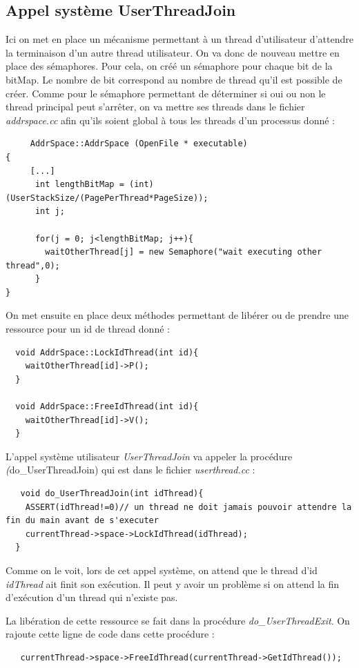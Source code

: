 \documentclass[a4paper,10pt]{report}
\begin{document}
    \textcolor{NavyBlue}{\subsection{Appel système UserThreadJoin}}
    Ici on met en place un mécanisme permettant à un thread d'utilisateur d'attendre la terminaison d'un autre thread utilisateur. On va donc de nouveau mettre
    en place des sémaphores.
    Pour cela, on créé un sémaphore pour chaque bit de la bitMap. Le nombre de bit correspond au nombre de thread qu'il est possible de créer. Comme pour 
    le sémaphore permettant de déterminer si oui ou non le thread principal peut s'arrêter, on va mettre ses threads dans le fichier \emph{addrspace.cc} afin
    qu'ils soient global à tous les threads d'un processus donné :
    \begin{lstlisting}
     AddrSpace::AddrSpace (OpenFile * executable)
{
     [...]
      int lengthBitMap = (int)(UserStackSize/(PagePerThread*PageSize));
      int j;

      for(j = 0; j<lengthBitMap; j++){
        waitOtherThread[j] = new Semaphore("wait executing other thread",0);
      }
}
    \end{lstlisting}
\newpage
    On met ensuite en place deux méthodes permettant de libérer ou de prendre une ressource pour un id de thread donné :
    \begin{lstlisting}
  void AddrSpace::LockIdThread(int id){
    waitOtherThread[id]->P();
  }

  void AddrSpace::FreeIdThread(int id){
    waitOtherThread[id]->V();
  }
    \end{lstlisting}
  L'appel système utilisateur \emph{UserThreadJoin} va appeler la procédure \emph(do\_UserThreadJoin) qui est dans le fichier \emph{userthread.cc} :
  \begin{lstlisting}
   void do_UserThreadJoin(int idThread){
	ASSERT(idThread!=0)// un thread ne doit jamais pouvoir attendre la fin du main avant de s'executer
	currentThread->space->LockIdThread(idThread);
  }
  \end{lstlisting}
  Comme on le voit, lors de cet appel système, on attend que le thread d'id \emph{idThread} ait finit son exécution. Il peut y avoir un problème si on 
  attend la fin d'exécution d'un thread qui n'existe pas.
  
  La libération de cette ressource se fait dans la procédure \emph{do\_UserThreadExit}. On rajoute cette ligne de code dans cette procédure :
  \begin{lstlisting}
   currentThread->space->FreeIdThread(currentThread->GetIdThread());
  \end{lstlisting}
  
\end{document}
